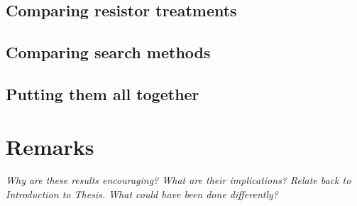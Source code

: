 \subsection{Comparing resistor treatments}

\subsection{Comparing search methods}

\subsection{Putting them all together}
\label{sec:method_combination}

\section{Remarks}

\textit{Why are these results encouraging? What are their implications? Relate
back to Introduction to Thesis. What could have been done differently?}
